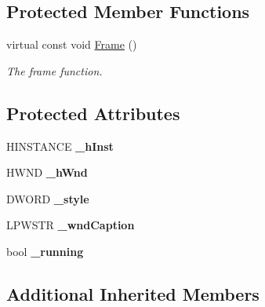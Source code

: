 \subsection*{Protected Member Functions}
\begin{DoxyCompactItemize}
\item 
virtual const void \hyperlink{class_ensum_1_1_core_1_1_win_window_a3e828ccbc90f0d6ed81c2320277561e6}{Frame} ()
\begin{DoxyCompactList}\small\item\em The frame function. \end{DoxyCompactList}\end{DoxyCompactItemize}
\subsection*{Protected Attributes}
\begin{DoxyCompactItemize}
\item 
H\+I\+N\+S\+T\+A\+N\+CE {\bfseries \+\_\+h\+Inst}\hypertarget{class_ensum_1_1_core_1_1_win_window_a19562456a0e7d38dc67b673ad8c0a9ea}{}\label{class_ensum_1_1_core_1_1_win_window_a19562456a0e7d38dc67b673ad8c0a9ea}

\item 
H\+W\+ND {\bfseries \+\_\+h\+Wnd}\hypertarget{class_ensum_1_1_core_1_1_win_window_af0bdb075823585bf3f99895ab4dcfffa}{}\label{class_ensum_1_1_core_1_1_win_window_af0bdb075823585bf3f99895ab4dcfffa}

\item 
D\+W\+O\+RD {\bfseries \+\_\+style}\hypertarget{class_ensum_1_1_core_1_1_win_window_af2bbdea21686b0d5a38bd3c85bc8f7db}{}\label{class_ensum_1_1_core_1_1_win_window_af2bbdea21686b0d5a38bd3c85bc8f7db}

\item 
L\+P\+W\+S\+TR {\bfseries \+\_\+wnd\+Caption}\hypertarget{class_ensum_1_1_core_1_1_win_window_a75879298465e6dab7671f0028489f82a}{}\label{class_ensum_1_1_core_1_1_win_window_a75879298465e6dab7671f0028489f82a}

\item 
bool {\bfseries \+\_\+running}\hypertarget{class_ensum_1_1_core_1_1_win_window_a11e86f63066c9cb730c152b23f2e5378}{}\label{class_ensum_1_1_core_1_1_win_window_a11e86f63066c9cb730c152b23f2e5378}

\end{DoxyCompactItemize}
\subsection*{Additional Inherited Members}


